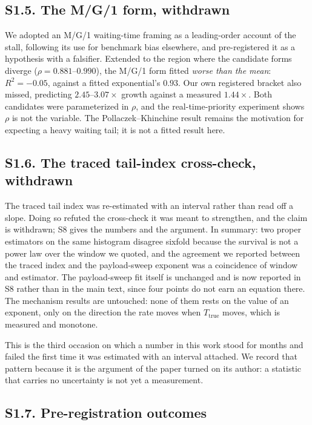 \documentclass[10pt,journal,onecolumn]{IEEEtran}
\begin{document}
\subsection{S1.5. The M/G/1 form, withdrawn}

We adopted an M/G/1 waiting-time framing as a leading-order account of the stall, following
its use for benchmark bias elsewhere, and pre-registered it as a hypothesis with a falsifier.
Extended to the region where the candidate forms diverge ($\rho = 0.881$--$0.990$), the M/G/1
form fitted \emph{worse than the mean}: $R^2 = -0.05$, against a fitted exponential's $0.93$.
Our own registered bracket also missed, predicting $2.45$--$3.07\times$ growth against a
measured $1.44\times$. Both candidates were parameterized in $\rho$, and the real-time-priority
experiment shows $\rho$ is not the variable. The Pollaczek--Khinchine result remains the
motivation for expecting a heavy waiting tail; it is not a fitted result here.

\subsection{S1.6. The traced tail-index cross-check, withdrawn}

The traced tail index was re-estimated with an interval rather than read off a
slope. Doing so refuted the cross-check it was meant
to strengthen, and the claim is withdrawn; S8 gives the numbers and the argument. In
summary: two proper estimators on the same histogram disagree sixfold because the survival
is not a power law over the window we quoted, and the agreement we reported between the
traced index and the payload-sweep exponent was a coincidence of window and estimator. The
payload-sweep fit itself is unchanged and is now reported in S8 rather than in the main
text, since four points do not earn an equation there. The mechanism results are untouched:
none of them rests on the value of an exponent, only on the direction the rate moves when
$T_{\mathrm{true}}$ moves, which is measured and monotone.

This is the third occasion on which a number in this work stood for months and failed
the first time it was estimated with an interval attached. We record that pattern
because it is the argument of the paper turned on its author: a statistic that carries no
uncertainty is not yet a measurement.

\subsection{S1.7. Pre-registration outcomes}
\end{document}
